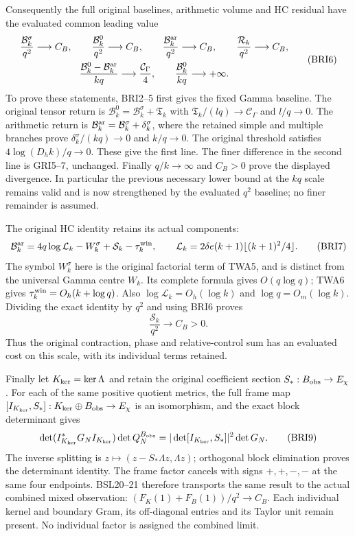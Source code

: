 \documentclass[11pt,a4paper]{article}
\begin{document}
Consequently the full original baselines, arithmetic volume and
HC residual have the evaluated common leading value
\[
\begin{gathered}
 \frac{\mathcal B_k^\sigma}{q^2}\longrightarrow C_B,\qquad
 \frac{\mathcal B_k^0}{q^2}\longrightarrow C_B,\qquad
 \frac{\mathcal B_k^{\rm ar}}{q^2}\longrightarrow C_B,\qquad
 \frac{\mathcal R_k}{q^2}\longrightarrow C_B,\\
 \frac{\mathcal B_k^0-\mathcal B_k^{\rm ar}}{kq}
                \longrightarrow\frac{\mathcal C_\Gamma}{4},
 \qquad \frac{\mathcal B_k^0}{kq}\longrightarrow+\infty.
\end{gathered}\tag{BRI6}
\]
To prove these statements, BRI2--5 first gives the fixed Gamma
baseline. The original tensor return is
$\mathcal B_k^0=\mathcal B_k^\sigma+\mathfrak T_k$ with
$\mathfrak T_k/(lq)\to\mathcal C_\Gamma$ and $l/q\to0$.
The arithmetic return is
$\mathcal B_k^{\rm ar}=\mathcal B_k^\sigma+\delta_k^\sigma$,
where the retained simple and multiple branches prove
$\delta_k^\sigma/(kq)\to0$ and $k/q\to0$.
The original threshold satisfies $4\log(D_hk)/q\to0$.
These give the first line. The finer difference in the second line
is GRI5--7, unchanged. Finally $q/k\to\infty$ and $C_B>0$
prove the displayed divergence. In particular the previous necessary
lower bound at the $kq$ scale remains valid and is now strengthened
by the evaluated $q^2$ baseline; no finer remainder is assumed.

The original HC identity retains its actual components:
\[
 \mathcal B_k^{\rm ar}=4q\log\mathcal L_k-W_k^\sigma
                  +\mathcal S_k-\tau_k^{\rm win},\qquad
 \mathcal L_k=2\delta e(k+1)\lfloor(k+1)^2/4\rfloor.
 \tag{BRI7}
\]
The symbol $W_k^\sigma$ here is the original factorial term of
TWA5, and is distinct from the universal Gamma centre $W_k$.
Its complete formula gives $O(q\log q)$; TWA6 gives
$\tau_k^{\rm win}=O_h(k+\log q)$. Also
$\log\mathcal L_k=O_h(\log k)$ and $\log q=O_m(\log k)$.
Dividing the exact identity by $q^2$ and using BRI6 proves
\[
 \frac{\mathcal S_k}{q^2}\longrightarrow C_B>0.
 \tag{BRI8}
\]
Thus the original contraction, phase and relative-control sum has
an evaluated cost on this scale, with its individual terms retained.

Finally let $K_{\rm ker}=\ker\Lambda$ and retain the original
coefficient section $S_*:B_{\rm obs}\to E_\chi$.
For each of the same positive quotient metrics, the full frame map
$[I_{K_{\rm ker}},S_*]:K_{\rm ker}\oplus B_{\rm obs}\to E_\chi$
is an isomorphism, and the exact block determinant gives
\[
 \det(I_{K_{\rm ker}}^*G_NI_{K_{\rm ker}})\det Q_N^{B_{\rm obs}}
 =|\det[I_{K_{\rm ker}},S_*]|^2\det G_N.
 \tag{BRI9}
\]
The inverse splitting is $z\mapsto(z-S_*\Lambda z,\Lambda z)$;
orthogonal block elimination proves the determinant identity.
The frame factor cancels with signs $+,+,-,-$ at the same four
endpoints. BSL20--21 therefore transports the same result to the
actual combined mixed observation:
$(F_K(1)+F_B(1))/q^2\to C_B$. Each individual kernel and
boundary Gram, its off-diagonal entries and its Taylor unit
remain present. No individual factor is assigned the combined limit.
\end{document}
